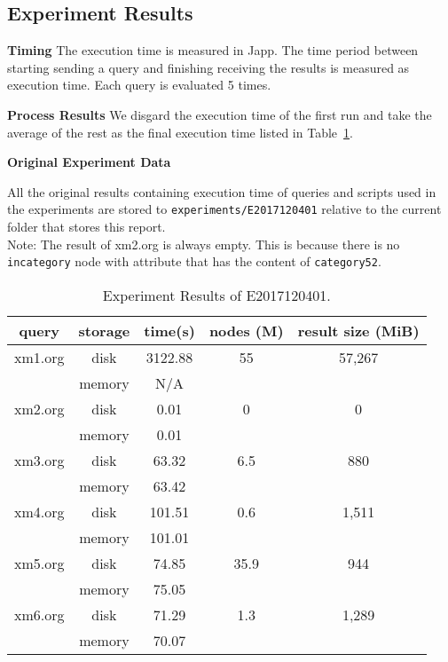 \subsection{Experiment Results}

\textbf{Timing} The execution time is measured in Japp. The time period between
starting sending a query and finishing receiving the results is measured as
execution time. Each query is evaluated 5 times.

\textbf{Process Results}
We disgard the execution time of the first run and take the average of the rest as
the final execution time listed in Table~\ref{table:E2017120401_1}.


\textbf{Original Experiment Data}

All the original results containing execution time of queries and scripts used
in the experiments  are stored to \texttt{experiments/E2017120401} relative to
the current folder that stores this report.\\

Note: The result of xm2.org is always empty. This is because there is no \texttt{incategory} node
with attribute that has the content of \texttt{category52}.


\begin{table}[t]
	\caption{Experiment Results of E2017120401.}
	\label{table:E2017120401_1}
	\centering
	\begin{tabular}{c|c|c|c|c}
		\hline \hline
		query  & storage & time(s)  &  nodes (M) &  result size (MiB)  \\
		\hline \hline
		xm1.org &  disk   & 3122.88  &  55 &  57,267  \\  %
		& memory  &    N/A   &  \\
		\hline
		xm2.org &  disk   &    0.01  &  0 &            0 \\
		& memory  &    0.01  &  \\
		\hline
		xm3.org &  disk   &  63.32  &  6.5 &  880 \\  %
		& memory  &  63.42  &  \\
		\hline
		xm4.org &  disk   &  101.51  & 0.6 & 1,511 \\ %
		& memory  &  101.01  &  \\
		\hline
		xm5.org &  disk   &  74.85  &  35.9 &  944 \\ %
		& memory  &  75.05   &   \\
		\hline
		xm6.org &  disk   &  71.29   &  1.3 & 1,289 \\ %
		& memory  &  70.07   &   \\
		\hline \hline
	\end{tabular}
\end{table}





